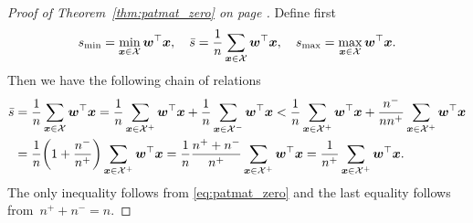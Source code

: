 \patmatzero*
\begin{proof}[Proof of Theorem~\ref{thm:patmat_zero} on page \pageref{thm:patmat_zero}]
  Define first
  \begin{equation*}
    \begin{aligned}
      s_{\min} = \min_{\bm{x} \in \mathcal{X}}\bm{w}^\top \bm{x}, \quad
      \bar{s} = \frac{1}{n}\sum_{\bm{x} \in \mathcal{X}}\bm{w}^\top \bm{x} , \quad
      s_{\max} = \max_{\bm{x} \in \mathcal{X}}\bm{w}^\top \bm{x}.
    \end{aligned}
  \end{equation*}
  Then we have the following chain of relations
  \begin{equation}\label{eq:patmat_zero_aux0}
    \begin{aligned}
      \bar{s}
      & = \frac{1}{n}\sum_{\bm{x} \in \Xc}\bm{w}^\top \bm{x}
        = \frac{1}{n}\sum_{\bm{x} \in \Xc^+}\bm{w}^\top \bm{x} + \frac{1}{n}\sum_{\bm{x} \in \Xc^-}\bm{w}^\top \bm{x}
        < \frac{1}{n}\sum_{\bm{x} \in \Xc^+}\bm{w}^\top \bm{x} + \frac{n^-}{nn^+}\sum_{\bm{x} \in \Xc^+}\bm{w}^\top \bm{x} \\
      & = \frac 1n\left(1+\frac{n^-}{n^+}\right)\sum_{\bm{x} \in \Xc^+}\bm{w}^\top \bm{x}
        = \frac 1n\frac{n^++n^-}{n^+}\sum_{\bm{x} \in \Xc^+}\bm{w}^\top \bm{x} = \frac 1{n^+}\sum_{\bm{x} \in \Xc^+}\bm{w}^\top \bm{x}.
    \end{aligned}
  \end{equation}
  The only inequality follows from \eqref{eq:patmat_zero} and the last equality follows from~$n^++n^-=n$.
  

\end{proof}

